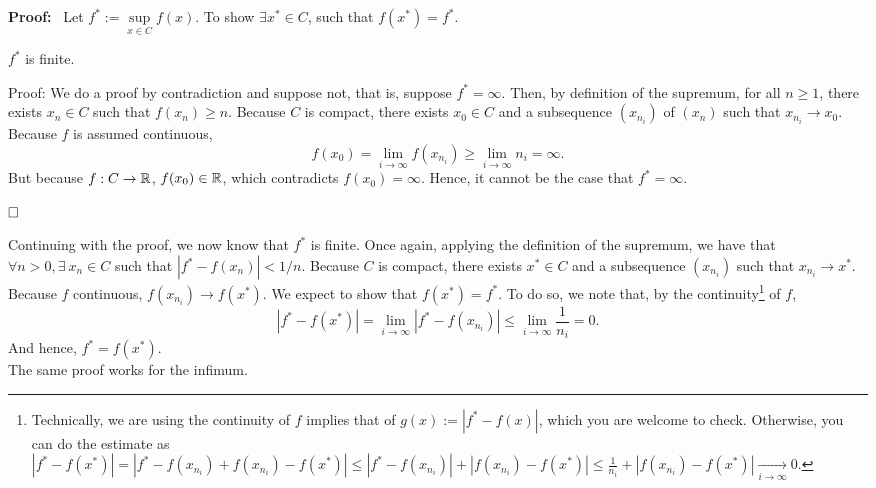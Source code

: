\textbf{Proof:}~ Let $f^\ast:=\sup\limits_{x\in C}f(x)$. To show $\exists x^\ast \in C$, such that $f(x^\ast)=f^\ast$.\\

\begin{claim} $f^\ast$ is finite.
\end{claim}

{Proof:} We do a proof by contradiction and suppose not, that is, suppose $f^\ast = \infty$. Then, by definition of the supremum, for all $n\ge 1$, there exists $x_n \in C$ such that $f(x_n) \ge n$. Because $C$ is compact, there exists $x_0 \in C$ and a subsequence $(x_{n_i})$ of $(x_n)$ such that
$x_{n_i} \to x_0$. Because $f$ is assumed continuous, 
$$f(x_0) = \lim_{i \to \infty} f(x_{n_i}) \ge   \lim_{i \to \infty} n_i = \infty.$$
But because $f:C \to \mathbb R$, $f(x_0) \in \mathbb R$, which contradicts $f(x_0) = \infty$. Hence, it cannot be the case that $f^\ast = \infty$.

$\hfill \square$

Continuing with the proof, we now know that $f^\ast$ is finite. Once again, applying the definition of the supremum, we have that $\forall n>0, \exists ~x_n\in C$ such that $|f^\ast-f(x_n) |<1/n$. Because
    $C$ is compact,  there exists $x^\ast \in C$ and a subsequence $(x_{n_i})$ such that 	$x_{n_i} \to x^\ast$. Because $f$ continuous, $f(x_{n_i})\to f(x^\ast)$. We expect to show that $f(x^\ast) = f^\ast$. To do so, we note that, by the continuity\footnote{Technically, we are using the continuity of $f$ implies that of $g(x):=|f^\ast - f(x)|$, which you are welcome to check. Otherwise, you can do the estimate as $|f^\ast -f(x^\ast)| =|f^\ast - f(x_{n_i}) + f(x_{n_i})- f(x^\ast)| \le  |f^\ast - f(x_{n_i})| + |f(x_{n_i}) - f(x^\ast)|  \le \frac{1}{n_i} + |f(x_{n_i}) - f(x^\ast)|  \xrightarrow[i\to \infty]{}0.$ } of $f$,
$$|f^\ast -f(x^\ast)|= \lim_{i \to \infty} |f^\ast - f(x_{n_i})|  \le  \lim_{i \to \infty} \frac{1}{n_i}=0. $$
And hence, 
    $f^\ast=f(x^\ast)$.\\
    
    The same proof works for the infimum. 
    
    \Qed

